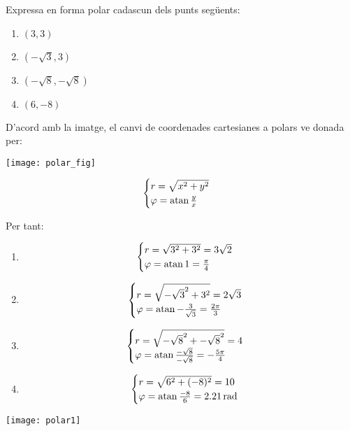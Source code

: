 \Exercise Expressa en forma polar cadascun dels punts següents:

\begin{multicols}{2}
  \begin{enumerate}
    \item $(3,3)$  \item $(-\sqrt{3},3)$ \item $(-\sqrt{8},-\sqrt{8})$ \item $(6,-8)$
  \end{enumerate}
\end{multicols}

\Answer

D'acord amb la imatge, el canvi de coordenades cartesianes a polars ve donada per:


\begin{minipage}{0.49\linewidth}
  \begin{center}  
    \texttt{[image: polar\_fig]}
  \end{center}
\end{minipage}
\hspace{0.01\linewidth}
\begin{minipage}{0.49\linewidth}
  \[\begin{cases}r=\sqrt{x^2+y^2}\\ \varphi=\atan{\frac{y}{x}}\end{cases}\]
\end{minipage}
Per tant:
\begin{enumerate}
  \item \[\begin{cases}r=\sqrt{3^2+3^2}=3\sqrt{2}\\\varphi=\atan{1}=\frac{\pi}{4}\end{cases}\]  
  \item  \[\begin{cases}r=\sqrt{{-\sqrt{3}}^2+3^2}=2\sqrt{3}\\\varphi=\atan{-\frac{3}{\sqrt{3}}}=\frac{2\pi}{3}\end{cases}\]  
  \item \[\begin{cases}r=\sqrt{-\sqrt{8}^2+-\sqrt{8}^2}=4\\\varphi=\atan{\frac{-\sqrt{8}}{-\sqrt{8}}}=-\frac{5\pi}{4}\end{cases}\]  
  \item \[\begin{cases}r=\sqrt{6^2+(-8)^2}=10\\\varphi=\atan{\frac{-8}{6}}=2.21\, \mathrm{rad}\end{cases}\]  
\end{enumerate}
\begin{center}
  \texttt{[image: polar1]}
\end{center}

\blacksquare 